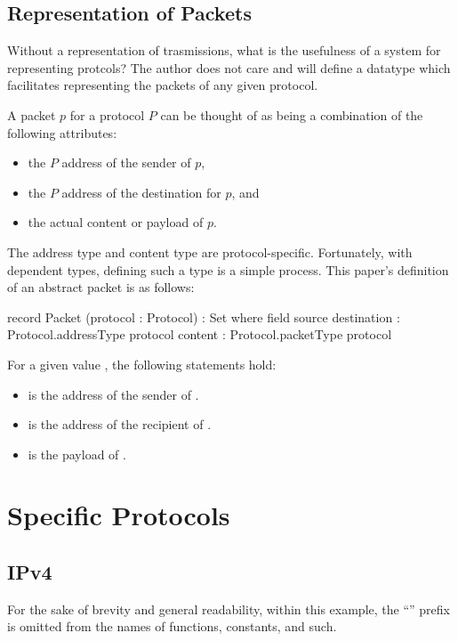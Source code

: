 \documentclass{report}
\begin{document}
\chapter{Representation of Packets}
Without a representation of trasmissions, what is the usefulness of a system for representing protcols?  The author does not care and will define a datatype which facilitates representing the packets of any given protocol.

A packet \(p\) for a protocol \(P\) can be thought of as being a combination of the following attributes:
\begin{itemize}
	\item the \(P\) address of the sender of \(p\),
	\item the \(P\) address of the destination for \(p\), and
	\item the actual content or payload of \(p\).
\end{itemize}

The address type and content type are protocol-specific.  Fortunately, with dependent types, defining such a type is a simple process.  This paper's definition of an abstract packet is as follows:

\begin{code}
  record Packet (protocol : Protocol) : Set where
    field
      source
       destination : Protocol.addressType protocol
      content : Protocol.packetType protocol
\end{code}

For a given   value , the following statements hold:
\begin{itemize}
	\item {}  is the address of the sender of .
	\item {}  is the address of the recipient of .
	\item {}  is the payload of .
\end{itemize}

\part{Specific Protocols}

\chapter{IPv4}
For the sake of brevity and general readability, within this example, the ``'' prefix is omitted from the names of functions, constants, and such.
\end{document}

